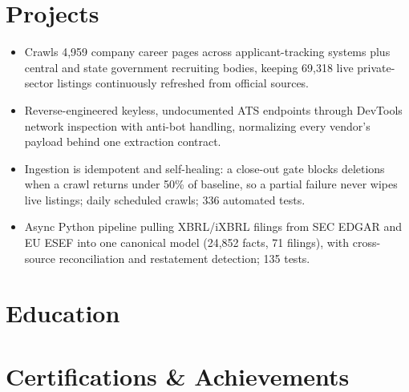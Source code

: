 \documentclass[10pt,a4paper]{article}
\begin{document}
\section{Projects}
\begin{itemize}
  \item Crawls 4,959 company career pages across applicant-tracking systems plus central and state government recruiting bodies, keeping 69,318 live private-sector listings continuously refreshed from official sources.
  \item Reverse-engineered keyless, undocumented ATS endpoints through DevTools network inspection with anti-bot handling, normalizing every vendor's payload behind one extraction contract.
  \item Ingestion is idempotent and self-healing: a close-out gate blocks deletions when a crawl returns under 50\% of baseline, so a partial failure never wipes live listings; daily scheduled crawls; 336 automated tests.
\end{itemize}

\begin{itemize}
  \item Async Python pipeline pulling XBRL/iXBRL filings from SEC EDGAR and EU ESEF into one canonical model (24,852 facts, 71 filings), with cross-source reconciliation and restatement detection; 135 tests.
\end{itemize}

\section{Education}

\section{Certifications \& Achievements}
\end{document}
